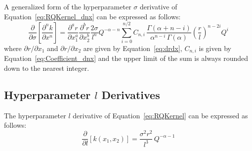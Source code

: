 \documentclass{article}
\begin{document}
A generalized form of the hyperparameter $\sigma$ derivative of Equation~\eqref{eq:RQKernel_dnx} can be expressed as follows:
\begin{equation}
\label{eq:RQKernel_ds_dnx}
	\frac{\partial}{\partial \sigma} \left[\frac{\partial^n k}{\partial x^n}\right] = \frac{\partial^a r}{\partial x_1^a} \frac{\partial^b r}{\partial x_2^b} \frac{2 \sigma}{l^n} Q^{-\alpha - n} \sum_{i=0}^{n/2} C_{n,i} \, \frac{\Gamma\!\left(\alpha + n - i\right)}{\alpha^{n-i} \, \Gamma\!\left(\alpha\right)} \left(\frac{r}{l}\right)^{n-2i} Q^i
\end{equation}
where $\partial r/\partial x_1$ and $\partial r/\partial x_2$ are given by Equation~\eqref{eq:drdx}, $C_{n,i}$ is given by Equation~\eqref{eq:Coefficient_dnx} and the upper limit of the sum is always rounded down to the nearest integer.

\subsection{Hyperparameter $l$ Derivatives}
\label{subsec:RQHypDer_l}

The hyperparameter $l$ derivative of Equation~\eqref{eq:RQKernel} can be expressed as follows:
\begin{equation}
\label{eq:RQKernel_dl}
	\frac{\partial}{\partial l} \left[k\!\left(x_1,x_2\right)\right] = \frac{\sigma^2 r^2}{l^3} \, Q^{-\alpha - 1}
\end{equation}

\begin{comment}
\begin{equation}
\label{eq:RQKernel_dl_d1x}
	\begin{gathered}
	\frac{\partial}{\partial l} \left[\frac{\partial k\!\left(x_1,x_2\right)}{\partial x_1}\right] = - \frac{\partial r}{\partial x_1} \frac{\sigma^2 r}{l^3} \left(\frac{r^2}{l^2} - 2\right) z^{-\alpha - 2} \\
	\frac{\partial}{\partial l} \left[\frac{\partial k\!\left(x_1,x_2\right)}{\partial x_2}\right] = - \frac{\partial r}{\partial x_2} \frac{\sigma^2 r}{l^3} \left(\frac{r^2}{l^2} - 2\right) z^{-\alpha - 2}
	\end{gathered}
\end{equation}

\begin{equation}
\label{eq:RQKernel_dl_d2x}
	\frac{\partial}{\partial l} \left[\frac{\partial^2 k\!\left(x_1,x_2\right)}{\partial x_1 \partial x_2}\right] =  \frac{\partial r}{\partial x_1} \frac{\partial r}{\partial x_2} \frac{\sigma^2}{l^3} \\
	\left(\frac{r^4}{l^4} \frac{2\alpha - 1}{2\alpha} - \frac{5r^2}{l^2} \frac{5\alpha - 3}{5\alpha} + 2\right) z^{-\alpha - 3}
\end{equation}
\end{comment}
\end{document}
